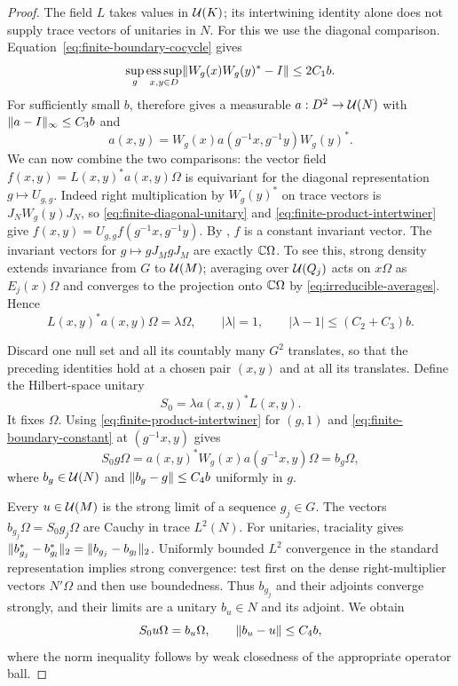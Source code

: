 \begin{proof}
The field $L$ takes values in $\mathcal U(K)$; its intertwining identity alone
does not supply trace vectors of unitaries in $N$.  For this we use the
diagonal comparison.  Equation~\eqref{eq:finite-boundary-cocycle} gives
\[
 \sup_g\mathop{\rm ess\,sup}_{x,y\in D}
 \lVert W_g(x)W_g(y)^*-I\rVert\le2C_1b.
\]
For sufficiently small $b$, 
therefore gives a measurable
$a:D^2\to\mathcal U(N)$ with $\lVert a-I\rVert_\infty\le C_3b$ and
\begin{equation}
 a(x,y)=W_g(x)a(g^{-1}x,g^{-1}y)W_g(y)^*.
 \label{eq:finite-diagonal-unitary}
\end{equation}
We can now combine the two comparisons: the vector field
$f(x,y)=L(x,y)^*a(x,y)\Omega$ is equivariant for the diagonal
representation $g\mapsto U_{g,g}$.  Indeed right multiplication
by $W_g(y)^*$ on trace vectors is $J_NW_g(y)J_N$, so
\eqref{eq:finite-diagonal-unitary} and
\eqref{eq:finite-product-intertwiner} give
$f(x,y)=U_{g,g}f(g^{-1}x,g^{-1}y)$.
By , $f$ is a constant invariant vector.
The invariant vectors for $g\mapsto gJ_MgJ_M$ are exactly $\mathbb C\Omega$.
To see this, strong density extends invariance from $G$ to $\mathcal U(M)$;
averaging over $\mathcal U(Q_j)$ acts on $x\Omega$ as $E_j(x)\Omega$ and
converges to the projection onto $\mathbb C\Omega$ by
\eqref{eq:irreducible-averages}.  Hence
\begin{equation}
 L(x,y)^*a(x,y)\Omega=\lambda\Omega,
 \qquad |\lambda|=1,
 \qquad |\lambda-1|\le(C_2+C_3)b.
 \label{eq:finite-boundary-constant}
\end{equation}

Discard one null set and all its countably many $G^2$ translates, so
that the preceding identities hold at a chosen pair $(x,y)$ and at all
its translates.  Define the Hilbert-space unitary
\[
 S_0=\lambda a(x,y)^*L(x,y).
\]
It fixes $\Omega$.  Using \eqref{eq:finite-product-intertwiner} for
$(g,1)$ and \eqref{eq:finite-boundary-constant} at $(g^{-1}x,y)$ gives
\begin{equation}
 S_0g\Omega
   =a(x,y)^*W_g(x)a(g^{-1}x,y)\Omega
   =b_g\Omega,
 \label{eq:finite-unitary-images}
\end{equation}
where $b_g\in\mathcal U(N)$ and $\lVert b_g-g\rVert\le C_4b$ uniformly in $g$.

Every $u\in\mathcal U(M)$ is the strong limit of a sequence $g_j\in G$.
The vectors $b_{g_j}\Omega=S_0g_j\Omega$ are Cauchy in trace $L^2(N)$.
For unitaries, traciality gives
$\lVert b_{g_j}^*-b_{g_l}^*\rVert_2=\lVert b_{g_j}-b_{g_l}\rVert_2$.
Uniformly bounded $L^2$ convergence in the standard representation
implies strong convergence: test first on the dense right-multiplier
vectors $N'\Omega$ and then use boundedness.  Thus $b_{g_j}$ and their
adjoints converge strongly, and their limits are a unitary $b_u\in N$
and its adjoint.  We obtain
\[
 S_0u\Omega=b_u\Omega,\qquad \lVert b_u-u\rVert\le C_4b,
\]
where the norm inequality follows by weak closedness of the appropriate
operator ball.


\end{proof}
